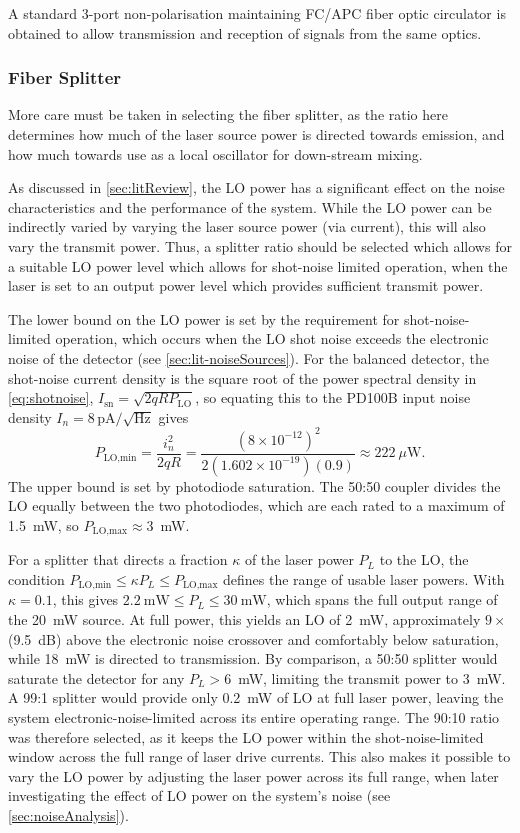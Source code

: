  A standard 3-port non-polarisation maintaining FC/APC fiber optic circulator is obtained to allow transmission and reception of signals from the same optics. 
\subsubsection{Fiber Splitter}
 More care must be taken in selecting the fiber splitter, as the ratio here determines how much of the laser source power is directed towards emission, and how much towards use as a local oscillator for down-stream mixing.
 
  As discussed in \autoref{sec:litReview}, the LO power has a significant effect on the noise characteristics and the performance of the system. While the LO power can be indirectly varied by varying the laser source power (via current), this will also vary the transmit power. Thus, a splitter ratio should be selected which allows for a suitable LO power level which allows for shot-noise limited operation, when the laser is set to an output power level which provides sufficient transmit power. 
 
 The lower bound on the LO power is set by the requirement for shot-noise-limited
 operation, which occurs when the LO shot noise exceeds the 
 electronic noise of the detector (see \autoref{sec:lit-noiseSources}). For the balanced detector, the shot-noise current density is the square root of
 the power spectral density in \autoref{eq:shotnoise},
 $I_{\mathrm{sn}} = \sqrt{2qRP_{\mathrm{LO}}}$, so equating this to the PD100B
 input noise density $I_n = 8\,\mathrm{pA}/\sqrt{\mathrm{Hz}}$ gives
 \begin{equation}
 	P_{\text{LO,min}} = \frac{i_n^2}{2qR}
 	= \frac{(8\times10^{-12})^2}{2(1.602\times10^{-19})(0.9)}
 	\approx 222~\mu\text{W}.
 	\label{eq:PLOmin}
 \end{equation}
 The upper bound is set by photodiode saturation. The 50:50 coupler divides the
 LO equally between the two photodiodes, which are each rated to a maximum of 1.5~mW, so
 $P_{\text{LO,max}} \approx 3$~mW.
 
 For a splitter that directs a fraction $\kappa$ of the laser power $P_L$ to the
 LO, the condition $P_{\text{LO,min}} \leq \kappa P_L \leq P_{\text{LO,max}}$ defines
 the range of usable laser powers. With $\kappa = 0.1$, this gives
 $2.2~\text{mW} \leq P_L \leq 30~\text{mW}$, which spans the full output range of
 the 20~mW source. At full power, this yields an LO of 2~mW, approximately
 $9\times$ (9.5~dB) above the electronic noise crossover and comfortably below
 saturation, while 18~mW is directed to transmission. By comparison, a 50:50
 splitter would saturate the detector for any $P_L > 6$~mW, limiting the transmit
 power to 3~mW. A 99:1 splitter would provide only 0.2~mW of LO at full laser
 power, leaving the system electronic-noise-limited across its entire operating
 range. The 90:10 ratio was therefore selected, as it keeps the LO power within
 the shot-noise-limited window across the full range of laser drive currents. This also makes it possible to vary the LO power by adjusting the laser power across its full range, when later investigating the effect of LO power on the  system's noise (see \autoref{sec:noiseAnalysis}). 
 

